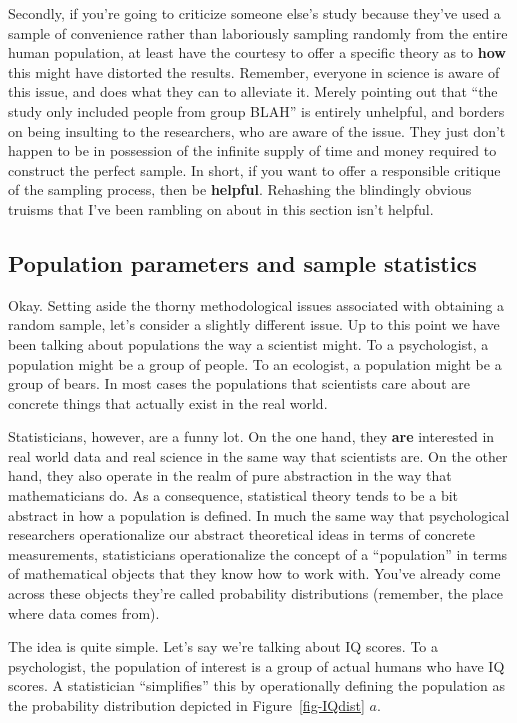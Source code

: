 \documentclass[
  letterpaper,
  DIV=11,
  numbers=noendperiod]{scrreprt}
\begin{document}
Secondly, if you're going to criticize someone else's study because
they've used a sample of convenience rather than laboriously sampling
randomly from the entire human population, at least have the courtesy to
offer a specific theory as to \textbf{how} this might have distorted the
results. Remember, everyone in science is aware of this issue, and does
what they can to alleviate it. Merely pointing out that ``the study only
included people from group BLAH'' is entirely unhelpful, and borders on
being insulting to the researchers, who are aware of the issue. They
just don't happen to be in possession of the infinite supply of time and
money required to construct the perfect sample. In short, if you want to
offer a responsible critique of the sampling process, then be
\textbf{helpful}. Rehashing the blindingly obvious truisms that I've
been rambling on about in this section isn't helpful.

\subsection{Population parameters and sample
statistics}\label{population-parameters-and-sample-statistics}

Okay. Setting aside the thorny methodological issues associated with
obtaining a random sample, let's consider a slightly different issue. Up
to this point we have been talking about populations the way a scientist
might. To a psychologist, a population might be a group of people. To an
ecologist, a population might be a group of bears. In most cases the
populations that scientists care about are concrete things that actually
exist in the real world.

Statisticians, however, are a funny lot. On the one hand, they
\textbf{are} interested in real world data and real science in the same
way that scientists are. On the other hand, they also operate in the
realm of pure abstraction in the way that mathematicians do. As a
consequence, statistical theory tends to be a bit abstract in how a
population is defined. In much the same way that psychological
researchers operationalize our abstract theoretical ideas in terms of
concrete measurements, statisticians operationalize the concept of a
``population'' in terms of mathematical objects that they know how to
work with. You've already come across these objects they're called
probability distributions (remember, the place where data comes from).

The idea is quite simple. Let's say we're talking about IQ scores. To a
psychologist, the population of interest is a group of actual humans who
have IQ scores. A statistician ``simplifies'' this by operationally
defining the population as the probability distribution depicted in
Figure~\ref{fig-IQdist} \(a\).
\end{document}
